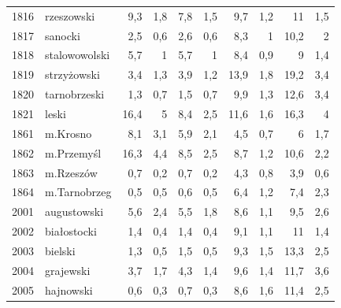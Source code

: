 \begin{center}
\begin{longtable}{lp{3cm}rrrrrrrr}
1816 & rzeszowski              & 9,3     & 1,8         & 7,8      & 1,5          & 9,7      & 1,2          & 11       & 1,5          \\
1817 & sanocki                 & 2,5     & 0,6         & 2,6      & 0,6          & 8,3      & 1            & 10,2     & 2            \\
1818 & stalowowolski           & 5,7     & 1           & 5,7      & 1            & 8,4      & 0,9          & 9        & 1,4          \\
1819 & strzyżowski             & 3,4     & 1,3         & 3,9      & 1,2          & 13,9     & 1,8          & 19,2     & 3,4          \\
1820 & tarnobrzeski            & 1,3     & 0,7         & 1,5      & 0,7          & 9,9      & 1,3          & 12,6     & 3,4          \\
1821 & leski                   & 16,4    & 5           & 8,4      & 2,5          & 11,6     & 1,6          & 16,3     & 4            \\
1861 & m.Krosno                & 8,1     & 3,1         & 5,9      & 2,1          & 4,5      & 0,7          & 6        & 1,7          \\
1862 & m.Przemyśl              & 16,3    & 4,4         & 8,5      & 2,5          & 8,7      & 1,2          & 10,6     & 2,2          \\
1863 & m.Rzeszów               & 0,7     & 0,2         & 0,7      & 0,2          & 4,3      & 0,8          & 3,9      & 0,6          \\
1864 & m.Tarnobrzeg            & 0,5     & 0,5         & 0,6      & 0,5          & 6,4      & 1,2          & 7,4      & 2,3          \\
2001 & augustowski             & 5,6     & 2,4         & 5,5      & 1,8          & 8,6      & 1,1          & 9,5      & 2,6          \\
2002 & białostocki             & 1,4     & 0,4         & 1,4      & 0,4          & 9,1      & 1,1          & 11       & 1,4          \\
2003 & bielski                 & 1,3     & 0,5         & 1,5      & 0,5          & 9,3      & 1,5          & 13,3     & 2,5          \\
2004 & grajewski               & 3,7     & 1,7         & 4,3      & 1,4          & 9,6      & 1,4          & 11,7     & 3,6          \\
2005 & hajnowski               & 0,6     & 0,3         & 0,7      & 0,3          & 8,6      & 1,6          & 11,4     & 2,5          \\

\end{longtable}
\end{center}
